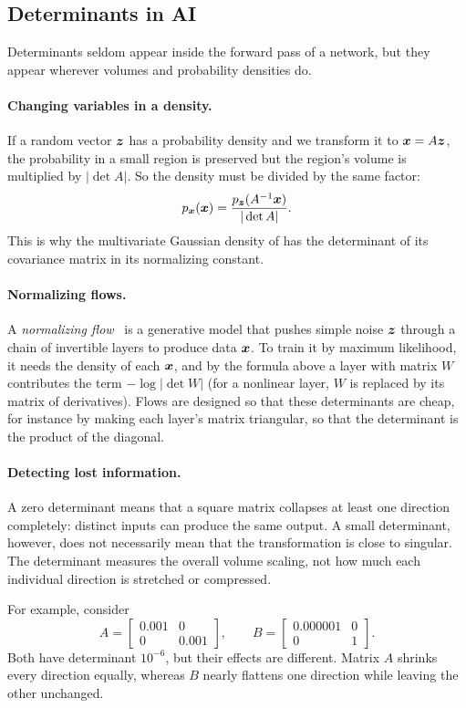 \subsection{Determinants in AI}
\label{sec:ch03-det-ai}

Determinants seldom appear inside the forward pass of a network, but they
appear wherever volumes and probability densities do.

\paragraph{Changing variables in a density.}
If a random vector $\bm{z}$ has a probability density and we transform
it to $\bm{x} = A\bm{z}$, the probability in a small region is
preserved but the region's volume is multiplied by $|\det A|$. So the
density must be divided by the same factor:
\[
  p_{\bm{x}}(\bm{x}) = \frac{p_{\bm{z}}(A^{-1}\bm{x})}{|\det A|} .
\]
This is why the multivariate Gaussian density of  has
the determinant of its covariance matrix in its normalizing constant.

\paragraph{Normalizing flows.}
A \emph{normalizing flow}~\cite{rezende2015flows} is a generative model
that pushes simple noise
$\bm{z}$ through a chain of invertible layers to produce data
$\bm{x}$. To train it by maximum likelihood, it needs the density of
each $\bm{x}$, and by the formula above a layer with matrix $W$ contributes the term
$-\log |\det W|$ (for a nonlinear layer, $W$ is replaced by its matrix
of derivatives). Flows are designed so that these determinants are cheap,
for instance by making each layer's matrix triangular, so that the
determinant is the product of the diagonal.


\paragraph{Detecting lost information.}
A zero determinant means that a square matrix collapses at least
one direction completely: distinct inputs can produce the same
output. A small determinant, however, does not necessarily mean
that the transformation is close to singular. The determinant
measures the overall volume scaling, not how much each individual
direction is stretched or compressed.

For example, consider
\[
A = \begin{bmatrix}
0.001 & 0 \\
0 & 0.001
\end{bmatrix},
\qquad
B = \begin{bmatrix}
0.000001 & 0 \\
0 & 1
\end{bmatrix}.
\]
Both have determinant $10^{-6}$, but their effects are different.
Matrix $A$ shrinks every direction equally, whereas $B$ nearly
flattens one direction while leaving the other unchanged.

